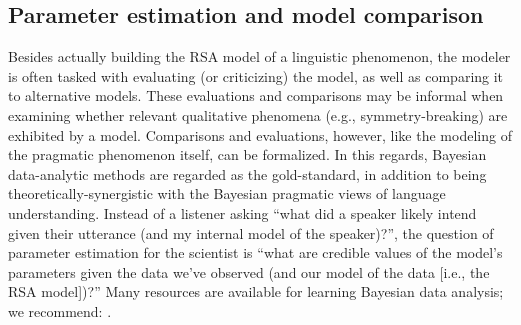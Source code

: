 \documentclass{sp}
\begin{document}
\subsection{Parameter estimation and model comparison}

Besides actually building the RSA model of a linguistic phenomenon, the modeler is often tasked with evaluating (or criticizing) the model, as well as comparing it to alternative models.
These evaluations and comparisons may be informal when examining whether relevant qualitative phenomena (e.g., symmetry-breaking) are exhibited by a model.
Comparisons and evaluations, however, like the modeling of the pragmatic phenomenon itself, can be formalized. 
In this regards, Bayesian data-analytic methods are regarded as the gold-standard, in addition to being theoretically-synergistic with the Bayesian pragmatic views of language understanding.
Instead of a listener asking ``what did a speaker likely intend given their utterance (and my internal model of the speaker)?'', the question of parameter estimation for the scientist is ``what are credible values of the model's parameters given the data we've observed (and our model of the data [i.e., the RSA model])?''
Many resources are available for learning Bayesian data analysis; we recommend: \cite{gelman2013bayesian, kruschke2014doing, lee2014bayesian,Lambert2018:A-Students-Guid}.
\end{document}
